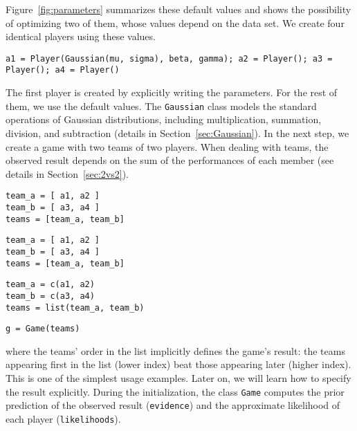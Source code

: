 \documentclass[article]{jss}
\begin{document}
Figure~\ref{fig:parameters} summarizes these default values and shows the possibility of optimizing two of them, whose values depend on the data set. 
We create four identical players using these values. 
%
\begin{lstlisting}[captionpos=b,backgroundcolor=\color{all},label=lst:player, caption={Players initialization.}, belowskip=0cm]
a1 = Player(Gaussian(mu, sigma), beta, gamma); a2 = Player(); a3 = Player(); a4 = Player()
\end{lstlisting}   
%
The first player is created by explicitly writing the parameters. For the rest of them, we use the default values.  
The \texttt{Gaussian} class models the standard operations of Gaussian distributions, including multiplication, summation, division, and subtraction (details in Section~\ref{sec:Gaussian}). 
In the next step, we create a game with two teams of two players. 
When dealing with teams, the observed result depends on the sum of the performances of each member (see details in Section~\ref{sec:2vs2}). 
%
\begin{paracol}{3}
\begin{lstlisting}[backgroundcolor=\color{julia!60}, belowskip=0cm]
team_a = [ a1, a2 ]
team_b = [ a3, a4 ]
teams = [team_a, team_b]
\end{lstlisting}
  \switchcolumn
\begin{lstlisting}[backgroundcolor=\color{python!60}, belowskip=0cm]
team_a = [ a1, a2 ]
team_b = [ a3, a4 ]
teams = [team_a, team_b]
\end{lstlisting}
   \switchcolumn
\begin{lstlisting}[backgroundcolor=\color{r!50}, belowskip=0cm]
team_a = c(a1, a2)
team_b = c(a3, a4)
teams = list(team_a, team_b)
\end{lstlisting}  
\end{paracol}
\begin{lstlisting}[captionpos=b,backgroundcolor=\color{all},label=lst:game,caption={Teams and game initialization.}, aboveskip=0cm,belowskip=0cm]
g = Game(teams)
\end{lstlisting}
where the teams' order in the list implicitly defines the game's result: the teams appearing first in the list (lower index) beat those appearing later (higher index). 
This is one of the simplest usage examples. 
Later on, we will learn how to specify the result explicitly. 
During the initialization, the class \texttt{Game} computes the prior prediction of the observed result (\texttt{evidence}) and the approximate likelihood of each player (\texttt{likelihoods}). 
\end{document}
